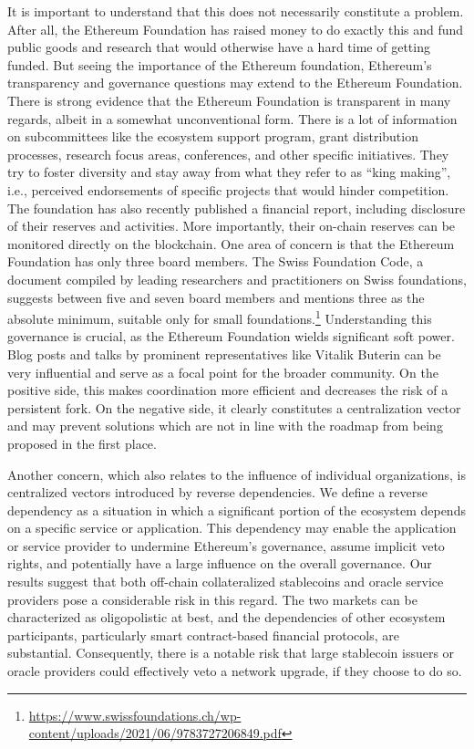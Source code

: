 \documentclass[No]{AEA}
\begin{document}
It is important to understand that this does not necessarily constitute a problem. After all, the Ethereum Foundation has raised money to do exactly this and fund public goods and research that would otherwise have a hard time of getting funded. 		
But seeing the importance of the Ethereum foundation, Ethereum's transparency and governance questions may extend to the Ethereum Foundation. There is strong evidence that the Ethereum Foundation is transparent in many regards, albeit in a somewhat unconventional form. There is a lot of information on subcommittees like the ecosystem support program, grant distribution processes, research focus areas, conferences, and other specific initiatives. They try to foster diversity and stay away from what they refer to as ``king making'', i.e., perceived endorsements of specific projects that would hinder competition. The foundation has also recently published a financial report, including disclosure of their reserves and activities. More importantly, their on-chain reserves can be monitored directly on the blockchain. One area of concern is that the Ethereum Foundation has only three board members. The Swiss Foundation Code, a document compiled by leading researchers and practitioners on Swiss foundations, suggests between five and seven board members and mentions three as the absolute minimum, suitable only for small foundations.\footnote{\url{https://www.swissfoundations.ch/wp-content/uploads/2021/06/9783727206849.pdf}} 
Understanding this governance is crucial, as the Ethereum Foundation wields significant soft power. Blog posts and talks by prominent representatives like Vitalik Buterin can be very influential and serve as a focal point for the broader community. On the positive side, this makes coordination more efficient and decreases the risk of a persistent fork. On the negative side, it clearly constitutes a centralization vector and may prevent solutions which are not in line with the roadmap from being proposed in the first place.

Another concern, which also relates to the influence of individual organizations, is centralized vectors introduced by reverse dependencies. We define a reverse dependency as a situation in which a significant portion of the ecosystem depends on a specific service or application. This dependency may enable the application or service provider to undermine Ethereum's governance, assume implicit veto rights, and potentially have a large influence on the overall governance.
Our results suggest that both off-chain collateralized stablecoins and oracle service providers pose a considerable risk in this regard. The two markets can be characterized as oligopolistic at best, and the dependencies of other ecosystem participants, particularly smart contract-based financial protocols, are substantial. Consequently, there is a notable risk that large stablecoin issuers or oracle providers could effectively veto a network upgrade, if they choose to do so.
	
\end{document}
